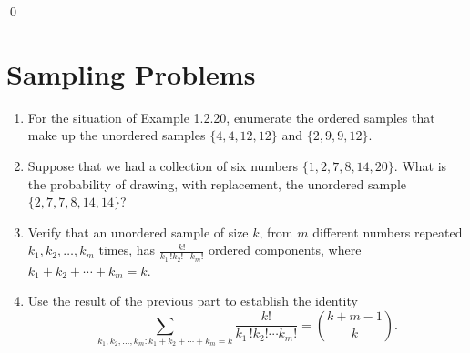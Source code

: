 \qed
\section{Sampling Problems}

\begin{problembox}
\begin{enumerate}[label=(\alph*)]
    \item For the situation of Example 1.2.20, enumerate the ordered samples that make up the unordered samples $\{4,4,12,12\}$ and $\{2,9,9,12\}$.
    \item Suppose that we had a collection of six numbers $\{1,2,7,8,14,20\}$. What is the probability of drawing, with replacement, the unordered sample $\{2,7,7,8,14,14\}$?
    \item Verify that an unordered sample of size $k$, from $m$ different numbers repeated $k_{1},k_{2},\ldots,k_{m}$ times, has $\frac{k!}{k_{1}\,!k_{2}!\cdots k_{m}!}$ ordered components, where $k_{1}+k_{2}+\cdots+k_{m}=k$.
    \item Use the result of the previous part to establish the identity
    \[ \sum_{k_{1},k_{2},\ldots,k_{m}:k_{1}+k_{2}+\cdots+k_{m}=k}\frac{k!}{k_{1}\,!k_{2}!\cdots k_{m}!}=\binom{k+m-1}{k}. \]
\end{enumerate}
\end{problembox}

